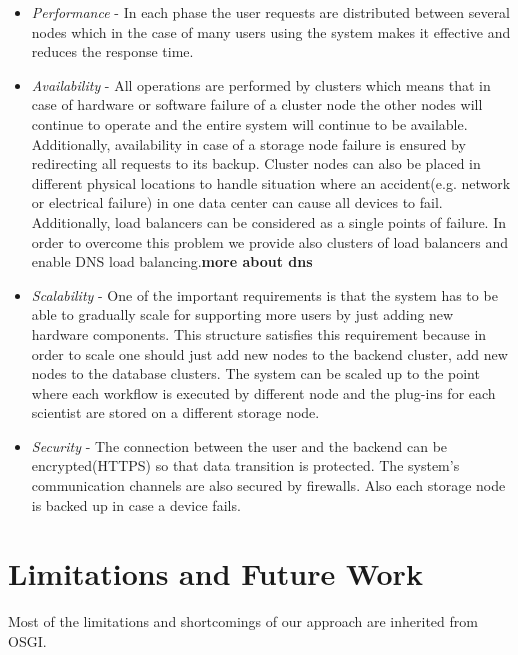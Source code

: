 \begin{itemize}

\item \textit{Performance} - In each phase the user requests are distributed between several nodes which in the case of many users using the system makes it effective and reduces the response time.

\item \textit{Availability} - All operations are performed by clusters which means that in case of hardware or software failure of a cluster node the other nodes will continue to operate and the entire system will continue to be available. Additionally, availability in case of a storage node failure is ensured by redirecting all requests to its backup. Cluster nodes can also be placed in different physical locations to handle situation where an accident(e.g. network or electrical failure) in one data center can cause all devices to fail. Additionally, load balancers can be considered as a single points of failure. In order to overcome this problem we provide also clusters of load balancers and enable DNS load balancing.\textbf{more about dns}

\item \textit{Scalability} - One of the important requirements is that the system has to be able to gradually scale for supporting more users  by just adding new hardware components. This structure satisfies this requirement because in order to scale one should just add new nodes to the backend cluster, add new nodes to the database clusters. The system can be scaled up to the point where each workflow is executed by different node and the plug-ins for each scientist are stored on a different storage node.

\item \textit{Security} - The connection between the user and the backend can be encrypted(HTTPS) so that data transition is protected. The system's communication channels are also secured by firewalls. Also each storage node is backed up in case a device fails.

\end{itemize}


\section{Limitations and Future Work}

Most of the limitations and shortcomings of our approach are inherited from OSGI. 

